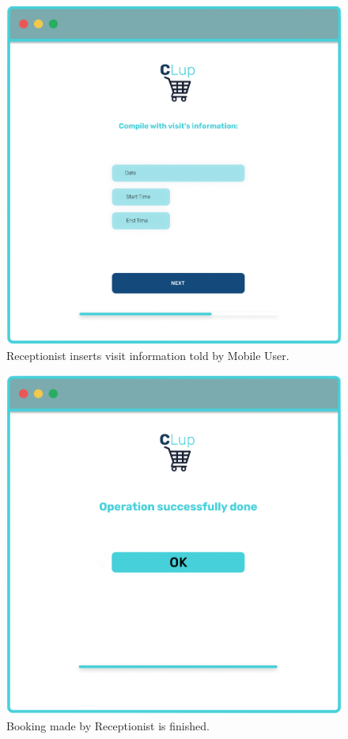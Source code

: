\begin{figure}[H]
  \caption{Receptionist inserts visit information told by Mobile User.}
  \label{fig:Login}
  \centering
  \includegraphics[scale=0.31]{images/mockup/info_visit_rec.png}

\end{figure}

\begin{figure}[H]
  \caption{Booking made by Receptionist is finished.}
  \label{fig:Login}
  \centering
  \includegraphics[scale=0.32]{images/mockup/Done_Rec.png}

\end{figure}
\par
\pagebreak

